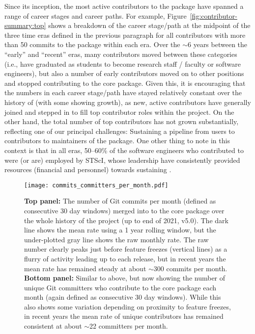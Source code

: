 \documentclass[modern]{aastex631}
\begin{document}
Since its inception, the most active contributors to the \astropypkg package
have spanned a range of career stages and career paths.
For example, Figure~\ref{fig:contributor-summary:top} shows a breakdown of the
career stage/path at the midpoint of the three time eras defined in the previous
paragraph for all contributors with more than 50 commits to the \astropypkg
package within each era.
Over the $\sim$6 years between the ``early'' and ``recent'' eras, many
contributors moved between these categories (i.e., have graduated as students to
become research staff / faculty or software engineers), but also a number of
early contributors moved on to other positions and stopped contributing to the
core \astropypkg package.
Given this, it is encouraging that the numbers in each career stage/path have
stayed relatively constant over the history of \astropy (with some showing
growth), as new, active contributors have generally joined and stepped in to
fill top contributor roles within the project.
On the other hand, the total number of top contributors has not grown
substantially, reflecting one of our principal challenges: Sustaining a pipeline
from users to contributors to maintainers of the package.
One other thing to note in this context is that in all eras, 50--60\% of the
software engineers who contributed to \astropypkg were (or are) employed by
STScI, whose leadership have consistently provided resources (financial and
personnel) towards sustaining \astropypkg.

\begin{figure}[t!]
    \begin{centering}
      \texttt{[image: commits\_committers\_per\_month.pdf]}
        \caption{
            \textbf{Top panel:} The number of Git commits per month (defined as
            consecutive 30 day windows) merged into to the \astropypkg core
            package over the whole history of the project (up to end of 2021,
            v5.0).
            The dark line shows the mean rate using a 1 year rolling window, but
            the under-plotted gray line shows the raw monthly rate.
            The raw number clearly peaks just before feature freezes (vertical
            lines) as a flurry of activity leading up to each release, but in
            recent years the mean rate has remained steady at about $\sim$300
            commits per month.
            \textbf{Bottom panel:} Similar to above, but now showing the number
            of unique Git committers who contribute to the \astropypkg core
            package each month (again defined as consecutive 30 day windows).
            While this also shows some variation depending on proximity to
            feature freezes, in recent years the mean rate of unique
            contributors has remained consistent at about $\sim$22 committers
            per month.
        }
        \label{fig:contributor-summary:per-month}
    \end{centering}
\end{figure}
\end{document}
